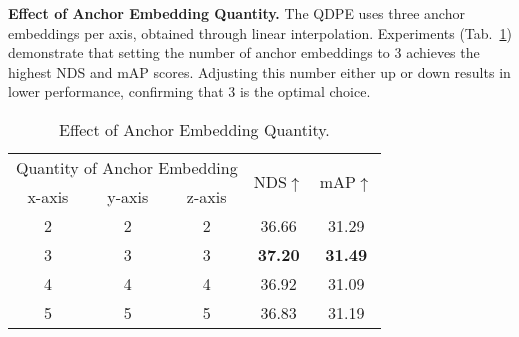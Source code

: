 

\textbf{Effect of Anchor Embedding Quantity.}
The QDPE uses three anchor embeddings per axis, obtained through linear interpolation. Experiments (Tab.~\ref{tab:sd}) demonstrate that setting the number of anchor embeddings to 3 achieves the highest NDS and mAP scores. Adjusting this number either up or down results in lower performance, confirming that 3 is the optimal choice.


\begin{table}[htb] %
\vspace{-2mm}
    \setlength{\tabcolsep}{4.7mm}
    \centering
    \footnotesize
    \centering
    \begin{tabular}{c|c|c|cc}
    \toprule[1.5pt]
    \multicolumn{3}{c|}{Quantity of Anchor Embedding} & \multirow{2}{*}{NDS$\uparrow$} & \multirow{2}{*}{mAP$\uparrow$}     \\ \cline{1-3}
    \multicolumn{1}{c|}{x-axis} & \multicolumn{1}{c|}{y-axis} & \multicolumn{1}{c|}{z-axis}  &  \\ 
    \midrule
    2 & 2 & 2 & 36.66 & 31.29 \\
    3 & 3 & 3 & \textbf{37.20} & \textbf{31.49} \\
    4 & 4 & 4 & 36.92 & 31.09 \\
    5 & 5 & 5 & 36.83 & 31.19 \\
    \bottomrule[1.5pt]
    \end{tabular}
    \vspace{-0.3cm}
    \caption{
    Effect of Anchor Embedding Quantity.
    }
    \label{tab:sd}
    \vspace{-0.5cm}
\end{table}

